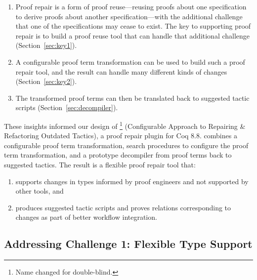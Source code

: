 \begin{enumerate}
\item Proof repair is a form of proof reuse---reusing proofs about one specification to derive proofs about another specification---with 
the additional challenge that one of the specifications may cease to exist.
The key to supporting proof repair is to build a proof reuse
tool that can handle that additional challenge (Section~\ref{sec:key1}). 
\item A configurable proof term transformation can be used to build such a proof repair tool,
and the result can handle many different kinds of changes (Section~\ref{sec:key2}).
\item The transformed proof terms can then be translated back to suggested tactic scripts (Section~\ref{sec:decompiler}).
\end{enumerate}

These insights informed our design of \toolname\footnote{Name changed for double-blind.} (Configurable Approach to Repairing \& Refactoring Outdated Tactics), a proof repair plugin for Coq 8.8.
\toolname combines a configurable proof term transformation,
search procedures to configure the proof term transformation,
and a prototype decompiler from proof terms back to suggested tactics.
The result is a flexible proof repair tool that: 

\begin{enumerate}
\item supports changes in types informed by proof engineers and not supported by other tools, and
\item produces suggested tactic scripts and proves relations corresponding to changes as part of better workflow integration.
\end{enumerate}

\subsection*{Addressing Challenge 1: Flexible Type Support}

